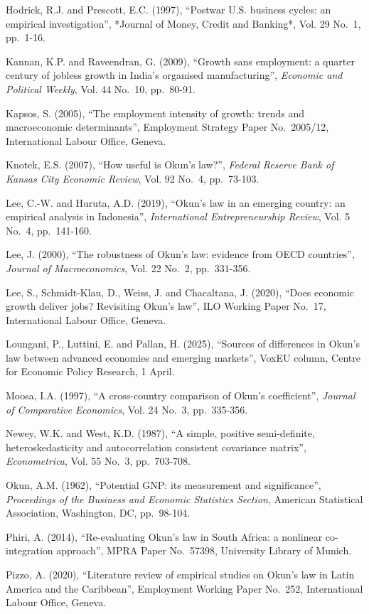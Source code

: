 \documentclass[12pt]{article}
\begin{document}
Hodrick, R.J. and Prescott, E.C. (1997), “Postwar U.S. business cycles: an empirical investigation”, *Journal of Money, Credit and Banking*, Vol. 29 No.~1, pp.~1-16.


Kannan, K.P. and Raveendran, G. (2009), “Growth sans employment: a quarter century of jobless growth in India’s organised manufacturing”, \textit{Economic and Political Weekly}, Vol. 44 No.~10, pp.~80-91.


Kapsos, S. (2005), “The employment intensity of growth: trends and macroeconomic determinants”, Employment Strategy Paper No.~2005/12, International Labour Office, Geneva.


Knotek, E.S. (2007), “How useful is Okun’s law?”, \textit{Federal Reserve Bank of Kansas City Economic Review}, Vol. 92 No.~4, pp.~73-103.


Lee, C.-W. and Huruta, A.D. (2019), “Okun’s law in an emerging country: an empirical analysis in Indonesia”, \textit{International Entrepreneurship Review}, Vol. 5 No.~4, pp.~141-160.


Lee, J. (2000), “The robustness of Okun’s law: evidence from OECD countries”, \textit{Journal of Macroeconomics}, Vol. 22 No.~2, pp.~331-356.


Lee, S., Schmidt-Klau, D., Weiss, J. and Chacaltana, J. (2020), “Does economic growth deliver jobs? Revisiting Okun’s law”, ILO Working Paper No.~17, International Labour Office, Geneva.


Loungani, P., Luttini, E. and Pallan, H. (2025), “Sources of differences in Okun’s law between advanced economies and emerging markets”, VoxEU column, Centre for Economic Policy Research, 1 April.


Moosa, I.A. (1997), “A cross-country comparison of Okun’s coefficient”, \textit{Journal of Comparative Economics}, Vol. 24 No.~3, pp.~335-356.


Newey, W.K. and West, K.D. (1987), “A simple, positive semi-definite, heteroskedasticity and autocorrelation consistent covariance matrix”, \textit{Econometrica}, Vol. 55 No.~3, pp.~703-708.


Okun, A.M. (1962), “Potential GNP: its measurement and significance”, \textit{Proceedings of the Business and Economic Statistics Section}, American Statistical Association, Washington, DC, pp.~98-104.


Phiri, A. (2014), “Re-evaluating Okun’s law in South Africa: a nonlinear co-integration approach”, MPRA Paper No.~57398, University Library of Munich.


Pizzo, A. (2020), “Literature review of empirical studies on Okun’s law in Latin America and the Caribbean”, Employment Working Paper No.~252, International Labour Office, Geneva.
\end{document}
